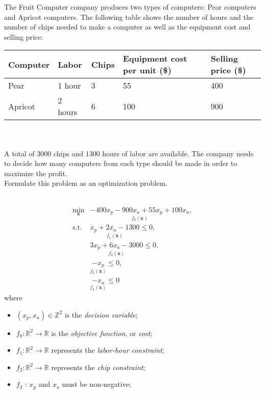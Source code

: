 \begin{homeworkProblem}
    The Fruit Computer company produces two types of computers: Pear computers 
    and Apricot computers. The following table shows the number of hours and 
    the number of chips needed to make a computer as well as the equipment cost
    and selling price:
    \\
    
    \begin{tabular}{ l l l l l }
        \hline
        Computer & Labor & Chips & Equipment cost per unit (\$) & Selling price (\$) \\ \hline
        Pear & 1 hour & 3 & 55 & 400 \\ 
        Apricot & 2 hours & 6 & 100 & 900 \\
        \hline
    \end{tabular}
    \\ \\
    
    A total of 3000 chips and 1300 hours of labor are available. The company 
    needs to decide how many computers from each type should be made in order to 
    maximize the profit.
    \\
    Formulate this problem as an optimization problem.
    \\ \\
    \begin{solution}
        \[
        \begin{array}{rl}
        \min\limits_{\boldsymbol{x}} & \underset{f_0(\boldsymbol{x})}{\boxed{-400x_p - 900x_a + 55x_p + 100x_a}}, \\ [3ex]
        \text{s.t.} & \underset{f_1(\boldsymbol{x})}{\boxed{x_p + 2x_a - 1300}} \leq 0, \\ [3ex]
                    & \underset{f_2(\boldsymbol{x})}{\boxed{3x_p + 6x_a - 3000}} \leq 0, \\ [3ex]
                    & \underset{f_3(\boldsymbol{x})}{\boxed{-x_p}} \leq 0, \\ [3ex]
                    & \underset{f_4(\boldsymbol{x})}{\boxed{-x_a}} \leq 0
        \end{array}
        \]
        where
        \begin{itemize}
            \item $(x_p, x_a) \in \mathbb{Z}^2$ is the \textit{decision variable};
            \item $f_0 : \mathbb{R}^2 \to \mathbb{R}$ is the \textit{objective function}, or \textit{cost};
            \item $f_1 : \mathbb{R}^2 \to \mathbb{R}$ represents the \textit{labor-hour constraint};
            \item $f_2 : \mathbb{R}^2 \to \mathbb{R}$ represents the \textit{chip constraint};
            \item $f_3$ : $x_p$ and $x_a$ must be non-negative;
        \end{itemize}
    \end{solution}
    

\end{homeworkProblem}